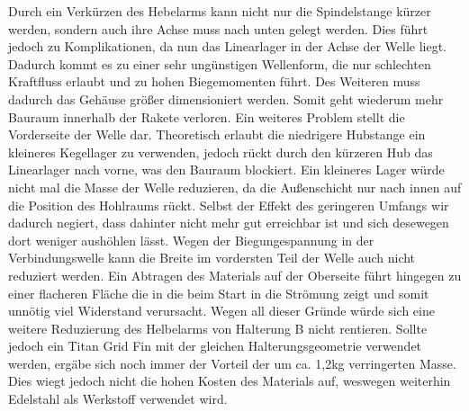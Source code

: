 Durch ein Verkürzen des Hebelarms kann nicht nur die Spindelstange kürzer werden, sondern auch ihre Achse muss nach unten gelegt werden. Dies führt jedoch zu Komplikationen, da nun das Linearlager in der Achse der Welle liegt. Dadurch kommt es zu einer sehr ungünstigen Wellenform, die nur schlechten Kraftfluss erlaubt und zu hohen Biegemomenten führt. Des Weiteren muss dadurch das Gehäuse größer dimensioniert werden. Somit geht wiederum mehr Bauraum innerhalb der Rakete verloren. Ein weiteres Problem stellt die Vorderseite der Welle dar. Theoretisch erlaubt die niedrigere Hubstange ein kleineres Kegellager zu verwenden, jedoch rückt durch den kürzeren Hub das Linearlager nach vorne, was den Bauraum blockiert. Ein kleineres Lager würde nicht mal die Masse der Welle reduzieren, da die Außenschicht nur nach innen auf die Position des Hohlraums rückt. Selbst der Effekt des geringeren Umfangs wir dadurch negiert, dass dahinter nicht mehr gut erreichbar ist und sich desewegen dort weniger aushöhlen lässt. Wegen der Biegungespannung in der Verbindungswelle kann die Breite im vordersten Teil der Welle auch nicht reduziert werden. Ein Abtragen des Materials auf der Oberseite führt hingegen zu einer flacheren Fläche die in die beim Start in die Strömung zeigt und somit unnötig viel Widerstand verursacht. Wegen all dieser Gründe würde sich eine weitere Reduzierung des Helbelarms von Halterung B nicht rentieren. Sollte jedoch ein Titan Grid Fin mit der gleichen Halterungsgeometrie verwendet werden, ergäbe sich noch immer der Vorteil der um ca. 1,2kg verringerten Masse. Dies wiegt jedoch nicht die hohen Kosten des Materials auf, weswegen weiterhin Edelstahl als Werkstoff verwendet wird.
